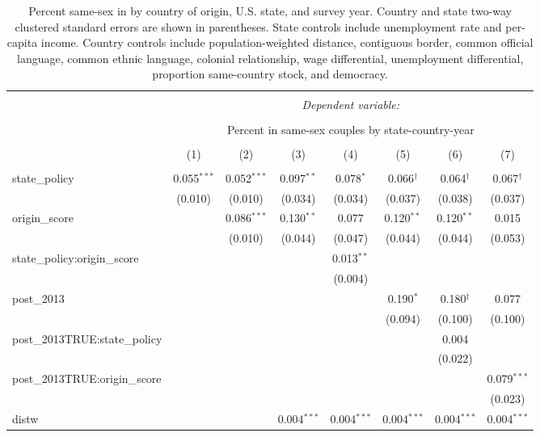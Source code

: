 \documentclass[
  11pt,
]{article}
\begin{document}
\begin{table}[!htbp] \centering 
  \caption{Percent same-sex in by country of origin, U.S. state, and survey year. Country and state two-way clustered standard errors are shown in parentheses. State controls include unemployment rate and per-capita income. Country controls include population-weighted distance, contiguous border, common official language, common ethnic language, colonial relationship, wage differential, unemployment differential, proportion same-country stock, and democracy.} 
  \label{tab:state-props-full} 
\begin{tabular}{@{\extracolsep{2pt}}lccccccc} 
\\[-1.8ex]\hline 
\hline \\[-1.8ex] 
 & \multicolumn{7}{c}{\textit{Dependent variable:}} \\ 
\cline{2-8} 
\\[-1.8ex] & \multicolumn{7}{c}{Percent in same-sex couples by state-country-year} \\ 
\\[-1.8ex] & (1) & (2) & (3) & (4) & (5) & (6) & (7)\\ 
\hline \\[-1.8ex] 
 state\_policy & 0.055$^{***}$ & 0.052$^{***}$ & 0.097$^{**}$ & 0.078$^{*}$ & 0.066$^{†}$ & 0.064$^{†}$ & 0.067$^{†}$ \\ 
  & (0.010) & (0.010) & (0.034) & (0.034) & (0.037) & (0.038) & (0.037) \\ 
  origin\_score &  & 0.086$^{***}$ & 0.130$^{**}$ & 0.077 & 0.120$^{**}$ & 0.120$^{**}$ & 0.015 \\ 
  &  & (0.010) & (0.044) & (0.047) & (0.044) & (0.044) & (0.053) \\ 
  state\_policy:origin\_score &  &  &  & 0.013$^{**}$ &  &  &  \\ 
  &  &  &  & (0.004) &  &  &  \\ 
  post\_2013 &  &  &  &  & 0.190$^{*}$ & 0.180$^{†}$ & 0.077 \\ 
  &  &  &  &  & (0.094) & (0.100) & (0.100) \\ 
  post\_2013TRUE:state\_policy &  &  &  &  &  & 0.004 &  \\ 
  &  &  &  &  &  & (0.022) &  \\ 
  post\_2013TRUE:origin\_score &  &  &  &  &  &  & 0.079$^{***}$ \\ 
  &  &  &  &  &  &  & (0.023) \\ 
  distw &  &  & 0.004$^{***}$ & 0.004$^{***}$ & 0.004$^{***}$ & 0.004$^{***}$ & 0.004$^{***}$ \\ 

\end{tabular}
\end{table}
\end{document}

